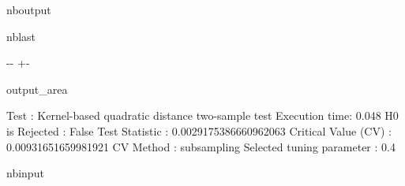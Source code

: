 \documentclass[letterpaper,10pt,english,openany,oneside]{sphinxmanual}
\begin{document}
\begin{sphinxuseclass}{nboutput}
\begin{sphinxuseclass}{nblast}
{

\kern-\sphinxverbatimsmallskipamount\kern-\baselineskip
\kern+\FrameHeightAdjust\kern-\fboxrule
\vspace{\nbsphinxcodecellspacing}

\begin{sphinxuseclass}{output_area}
\begin{sphinxuseclass}{}


\begin{sphinxVerbatim}[commandchars=\\\{\}]
Test : Kernel-based quadratic distance two-sample test
Execution time: 0.048
H0 is Rejected : False
Test Statistic : 0.0029175386660962063
Critical Value (CV) : 0.00931651659981921
CV Method : subsampling
Selected tuning parameter : 0.4
\end{sphinxVerbatim}



\end{sphinxuseclass}
\end{sphinxuseclass}
}

\end{sphinxuseclass}
\end{sphinxuseclass}
\begin{sphinxuseclass}{nbinput}
{
\begin{sphinxVerbatim}[commandchars=\\\{\}]
\llap{\color{nbsphinxin}[8]:\,\hspace{\fboxrule}\hspace{\fboxsep}}
\end{sphinxVerbatim}
}

\end{sphinxuseclass}
\end{document}
